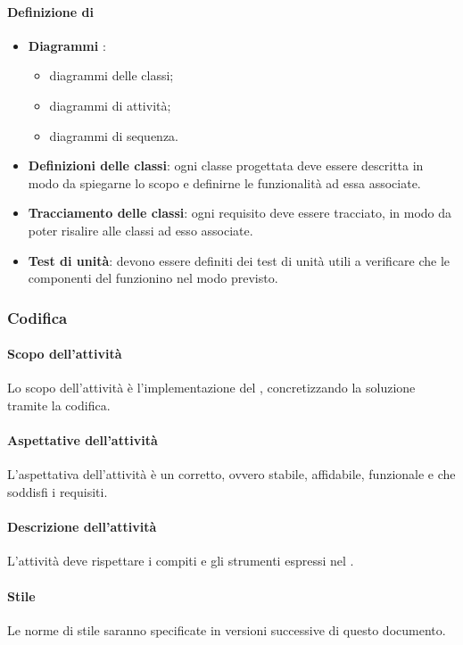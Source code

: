  \paragraph{Definizione di }
\begin{itemize}
	\item \textbf{Diagrammi }:
	\begin{itemize}
		\item diagrammi delle classi;
		\item diagrammi di attività;
		\item diagrammi di sequenza.
	\end{itemize}
	\item \textbf{Definizioni delle classi}: ogni classe progettata deve essere descritta in modo da spiegarne lo scopo e definirne le
funzionalità ad essa associate.
	\item \textbf{Tracciamento delle classi}: ogni requisito deve essere tracciato, in modo da poter risalire alle classi ad esso associate. 
	\item \textbf{Test di unità}: devono essere definiti dei test di unità utili a verificare che le componenti del  funzionino nel modo previsto.
\end{itemize}

\subsubsection{Codifica}
 \paragraph{Scopo dell'attività}
 Lo scopo dell'attività è l'implementazione del , concretizzando la soluzione tramite la codifica.  
 \paragraph{Aspettative dell'attività}
 L'aspettativa dell'attività è un  corretto, ovvero stabile, affidabile, funzionale e che soddisfi i requisiti. 
 \paragraph{Descrizione dell'attività}
 L'attività deve rispettare i compiti e gli strumenti espressi nel \PPdocRR.
 \paragraph{Stile}
Le norme di stile saranno specificate in versioni successive di questo documento.
